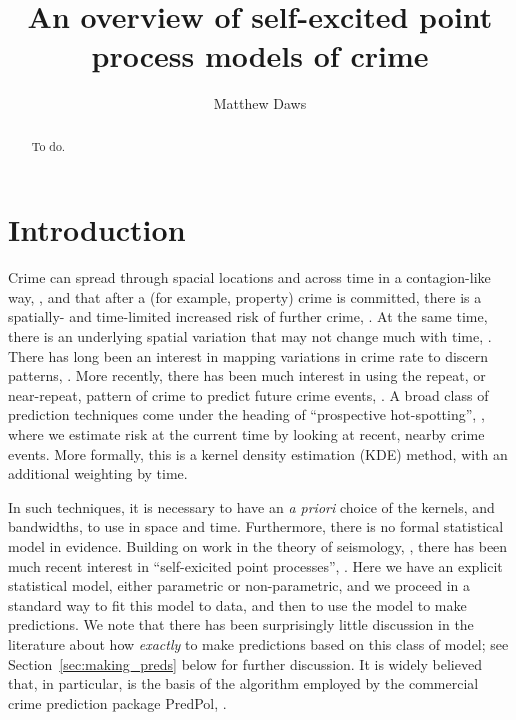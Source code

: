 \documentclass[twoside,a4paper]{article}
\theoremstyle{plain}
\theoremstyle{definition}
\begin{document}
\large
\title{An overview of self-excited point process models of crime}
\author{Matthew Daws}
\maketitle

\begin{abstract}
To do.
\end{abstract}


\section{Introduction}

Crime can spread through spacial locations and across time in a contagion-like way,
\cite{johnson}, and that after a (for example, property) crime is committed, there is
a spatially- and time-limited increased risk of further crime, \cite{jbberrt}.  At
the same time, there is an underlying spatial variation that may not change much with time,
\cite{johnson, bn}.  There has long been an interest in mapping variations in crime rate
to discern patterns, \cite{glv}.  More recently, there has been much interest in using
the repeat, or near-repeat, pattern of crime to predict future crime events, \cite{glv, jb, rand}.
A broad class of prediction techniques come under the heading of ``prospective hot-spotting'',
\cite{bjp, jbmbp}, where we estimate risk at the current time by looking at recent,
nearby crime events.  More formally, this is a kernel density estimation (KDE) method,
with an additional weighting by time.

In such techniques, it is necessary to have an \emph{a priori} choice of the kernels, and
bandwidths, to use in space and time.  Furthermore, there is no formal statistical model
in evidence.  Building on work in the theory of seismology, \cite{ml, vs, zovj}, there has
been much recent interest in ``self-exicited point processes'', \cite{mohler, sepp, sepp2, rc}.
Here we have an explicit statistical model, either parametric or non-parametric, and
we proceed in a standard way to fit this model to data, and then to use the model to make
predictions.  We note that there has been surprisingly little discussion in the literature
about how \emph{exactly} to make predictions based on this class of model; see
Section~\ref{sec:making_preds} below for further discussion.
It is widely believed that, in particular, \cite{sepp2} is the basis of the algorithm
employed by the commercial crime prediction package PredPol, \cite{predpol}.
\end{document}
